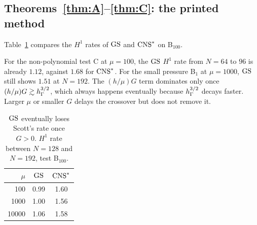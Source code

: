 \subsection{Theorems~\ref{thm:A}--\ref{thm:C}: the printed method}
Table~\ref{tab:gs} compares the $H^1$ rates of $\mathrm{GS}$ and $\mathrm{CNS}^\ast$ on B$_{100}$.

For the non-polynomial test C at $\mu=100$, the $\mathrm{GS}$ $H^1$ rate from $N=64$ to $96$ is already $1.12$, against $1.68$ for $\mathrm{CNS}^\ast$. For the small pressure B$_1$ at $\mu=1000$, $\mathrm{GS}$ still shows $1.51$ at $N=192$. The $(h/\mu)G$ term dominates only once $(h/\mu)G\gtrsim h_\Gamma^{3/2}$, which always happens eventually because $h_\Gamma^{3/2}$ decays faster. Larger $\mu$ or smaller $G$ delays the crossover but does not remove it.

\begin{table}[t]
\centering
\caption{$\mathrm{GS}$ eventually loses Scott's rate once $G>0$. $H^1$ rate between $N=128$ and $N=192$, test B$_{100}$.}\label{tab:gs}
\begin{tabular}{rcc}
\toprule
$\mu$ & $\mathrm{GS}$ & $\mathrm{CNS}^\ast$\\
\midrule
100 & 0.99 & 1.60\\
1000 & 1.00 & 1.56\\
10000 & 1.06 & 1.58\\
\bottomrule
\end{tabular}
\end{table}


